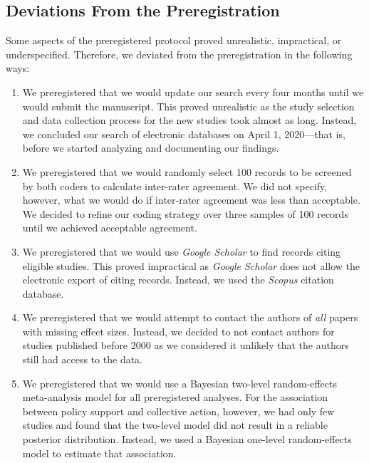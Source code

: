 \documentclass[12pt, letterpaper]{article}
\begin{document}
\hypertarget{deviations-from-the-preregistration}{%
\subsection{Deviations From the
Preregistration}\label{deviations-from-the-preregistration}}

Some aspects of the preregistered protocol proved unrealistic,
impractical, or underspecified. Therefore, we deviated from the
preregistration in the following ways:

\begin{enumerate}
\def\labelenumi{\arabic{enumi}.}
\item
  We preregistered that we would update our search every four months
  until we would submit the manuscript. This proved unrealistic as the
  study selection and data collection process for the new studies took
  almost as long. Instead, we concluded our search of electronic
  databases on April 1, 2020---that is, before we started analyzing and
  documenting our findings.
\item
  We preregistered that we would randomly select 100 records to be
  screened by both coders to calculate inter-rater agreement. We did not
  specify, however, what we would do if inter-rater agreement was less
  than acceptable. We decided to refine our coding strategy over three
  samples of 100 records until we achieved acceptable agreement.
\item
  We preregistered that we would use \emph{Google Scholar} to find
  records citing eligible studies. This proved impractical as
  \emph{Google Scholar} does not allow the electronic export of citing
  records. Instead, we used the \emph{Scopus} citation database.
\item
  We preregistered that we would attempt to contact the authors of
  \emph{all} papers with missing effect sizes. Instead, we decided to
  not contact authors for studies published before 2000 as we considered
  it unlikely that the authors still had access to the data.
\item
  We preregistered that we would use a Bayesian two-level random-effects
  meta-analysis model for all preregistered analyses. For the
  association between policy support and collective action, however, we
  had only few studies and found that the two-level model did not result
  in a reliable posterior distribution. Instead, we used a Bayesian
  one-level random-effects model to estimate that association.
\end{enumerate}
\end{document}
